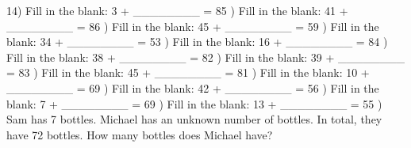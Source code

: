 \documentclass{article}%
\begin{document}
14) Fill in the blank: 3 + \_\_\_\_\_\_\_\_ = 85%
\newline%
\newline%
) Fill in the blank: 41 + \_\_\_\_\_\_\_\_ = 86%
\newline%
\newline%
) Fill in the blank: 45 + \_\_\_\_\_\_\_\_ = 59%
\newline%
\newline%
) Fill in the blank: 34 + \_\_\_\_\_\_\_\_ = 53%
\newline%
\newline%
) Fill in the blank: 16 + \_\_\_\_\_\_\_\_ = 84%
\newline%
\newline%
) Fill in the blank: 38 + \_\_\_\_\_\_\_\_ = 82%
\newline%
\newline%
) Fill in the blank: 39 + \_\_\_\_\_\_\_\_ = 83%
\newline%
\newline%
) Fill in the blank: 45 + \_\_\_\_\_\_\_\_ = 81%
\newline%
\newline%
) Fill in the blank: 10 + \_\_\_\_\_\_\_\_ = 69%
\newline%
\newline%
) Fill in the blank: 42 + \_\_\_\_\_\_\_\_ = 56%
\newline%
\newline%
) Fill in the blank: 7 + \_\_\_\_\_\_\_\_ = 69%
\newline%
\newline%
) Fill in the blank: 13 + \_\_\_\_\_\_\_\_ = 55%
\newline%
\newline%
) Sam has 7 bottles. Michael has an unknown number of bottles. In total, they have 72 bottles. How many bottles does Michael have?%
\newline%
\newline%
\end{document}

